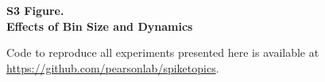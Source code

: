 \documentclass[10pt,letterpaper]{article}
\date{}
\begin{document}
\vspace*{0.35in}

\begin{flushleft}
{\Large
\textbf{S3 Figure. \\}
\bigskip
\textbf{Effects of Bin Size and Dynamics} %
}
\newline
\bigskip

%
%




\end{flushleft}


Code to reproduce all experiments presented here is available at
 \url{https://github.com/pearsonlab/spiketopics}.
\end{document}
